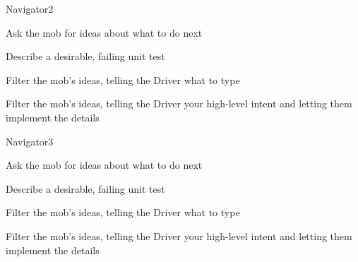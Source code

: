 \documentclass[20pt]{extarticle}
\begin{document}
\begin{role}{Navigator}{2}
  \item Ask the mob for ideas about what to do next
  \item Describe a desirable, failing unit test
  \item Filter the mob's ideas, telling the Driver what to type
  \item Filter the mob's ideas, telling the Driver your high-level
    intent and letting them implement the details
\end{role}

\begin{role}{Navigator}{3}
  \item Ask the mob for ideas about what to do next
  \item Describe a desirable, failing unit test
  \item Filter the mob's ideas, telling the Driver what to type
  \item Filter the mob's ideas, telling the Driver your high-level
    intent and letting them implement the details
\end{role}
\end{document}
